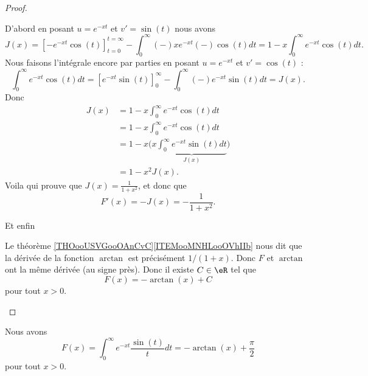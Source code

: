 \begin{proof}
\begin{subproof}
            D'abord en posant \( u= e^{-xt}\) et \( v'=\sin(t)\) nous avons
            \begin{equation}
                J(x)=\left[ - e^{-xt}\cos(t) \right]_{t=0}^{t=\infty}-\int_0^{\infty}(-)x e^{-xt}(-)\cos(t)dt=1-x\int_0^{\infty} e^{-xt}\cos(t)dt.
            \end{equation}
            Nous faisons l'intégrale encore par parties en posant \( u= e^{-xt}\) et \( v'=\cos(t)\) :
            \begin{equation}
                \int_0^{\infty} e^{-xt}\cos(t)dt=\left[  e^{-xt}\sin(t) \right]_0^{\infty}-\int_0^{\infty}(-) e^{-xt}\sin(t)dt=J(x).
            \end{equation}
            Donc
            \begin{subequations}
                \begin{align}
                    J(x)&=1-x\int_0^{\infty} e^{-xt}\cos(t)dt\\
                    &=1-x\int_0^{\infty} e^{-xt}\cos(t)dt\\
                    &=1-x\Big( x\underbrace{\int_0^{\infty} e^{-xt}\sin(t)dt}_{J(x)} \Big)\\
                    &=1-x^2J(x).
                \end{align}
            \end{subequations}
            Voila qui prouve que \( J(x)=\frac{1}{ 1+x^2 }\), et donc que
            \begin{equation}
                F'(x)=-J(x)=-\frac{1}{ 1+x^2 }.
            \end{equation}
            
        \item[Et enfin]

            Le théorème \ref{THOooUSVGooOAnCvC}\ref{ITEMooMNHLooOVhIIb} nous dit que la dérivée de la fonction \( \arctan\) est précisément \( 1/(1+x)\). Donc \( F\) et \( \arctan\) ont la même dérivée (au signe près). Donc il existe \( C\in \eR\) tel que
            \begin{equation}
                F(x)=-\arctan(x)+C
            \end{equation}
            pour tout \( x>0\).

    \end{subproof}
\end{proof}

\begin{lemma}
    Nous avons
    \begin{equation}
        F(x)=\int_0^{\infty} e^{-xt}\frac{ \sin(t) }{ t }dt=-\arctan(x)+\frac{ \pi }{2}
    \end{equation}
    pour tout \( x>0\).
\end{lemma}

